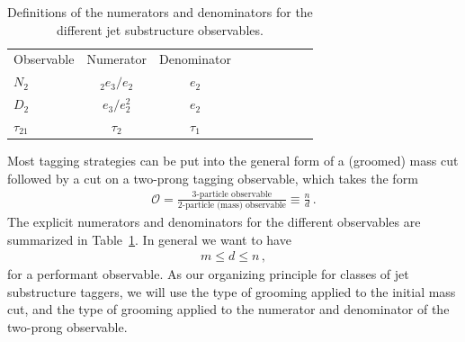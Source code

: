 \documentclass[11pt,letterpaper]{article}
\DeclareRobustCommand{\Tab}[1]{Table~\ref{#1}}
\newcommand{\ecfnobeta}[1]{e_{#1}}
\newcommand{\ecfvarnobeta}[2]{{_{#1}e_{#2}}}
\begin{document}
\begin{table}
\begin{center}
\begin{tabular}{| l | c | c |c |c|c|c |c|r| }
  \hline                       
  Observable &  Numerator & Denominator \\
  $N_2$ &   $\ecfvarnobeta{2}{3} / \ecfnobeta{2} $ & $ \ecfnobeta{2}$ \\
  $D_2$ &   $\ecfnobeta{3} / \ecfnobeta{2}^2 $ & $ \ecfnobeta{2}$ \\
  $\tau_{21}$ &   $\tau_2$ & $\tau_1$ \\
  \hline  
\end{tabular}
\end{center}
\caption{
Definitions of the numerators and denominators for the different jet substructure observables.
}
\label{tab:dn}
\end{table}


Most tagging strategies can be put into the general form of a (groomed) mass cut followed by a cut on a two-prong tagging observable, which takes the form
\begin{align}
\mathcal{O}=\frac{\text{3-particle observable}}{\text{2-particle (mass) observable}} \equiv \frac{n}{d}\,.
\end{align}
The explicit numerators and denominators for the different observables are summarized in \Tab{tab:dn}. In general we want to have
\begin{align}
m \leq d \leq n\,,
\end{align}
for a performant observable.
As our organizing principle for classes of  jet substructure taggers, we will use the type of grooming applied to the initial mass cut, and the type of grooming applied to the numerator and denominator of the two-prong observable.
\end{document}
